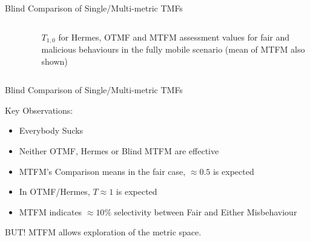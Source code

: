 \documentclass{beamer}
\begin{document}
\begin{frame}{Blind Comparison of Single/Multi-metric TMFs}
  \vspace{-24pt}%
  \begin{columns}
    \begin{column}[T]{0.5\textwidth}
      \begin{figure}[t]
        \centering
        \hfil
        \renewcommand{\thesubfigure}{c}%
        \label{fig:otmf_beta_comparison}
      \end{figure}%
    \end{column}
    \begin{column}[T]{0.5\textwidth}
      \begin{figure}[t]
        \centering
        \vspace{0pt}%
        \renewcommand{\thesubfigure}{b}%
        \label{fig:otmf_beta_comparison}
      \end{figure}
      $T_{1,0}$ for Hermes, OTMF and MTFM assessment values for fair and malicious behaviours in the fully mobile scenario (mean of MTFM also shown)

    \end{column}
  \end{columns}

  \framebreak
\end{frame}
\begin{frame}{Blind Comparison of Single/Multi-metric TMFs}

  Key Observations:
  \begin{itemize}
    \item Everybody Sucks
    \pause\item Neither OTMF, Hermes or Blind MTFM are effective
    \item MTFM's Comparison means in the fair case, $\approx0.5$ is expected
    \item In OTMF/Hermes, $T\approx1$ is expected
    \pause\item MTFM indicates $\approx10\%$ selectivity between Fair and Either Misbehaviour
  \end{itemize}
  \pause \alert{BUT!}  \pause MTFM allows exploration of the metric space.

\end{frame}
\end{document}

